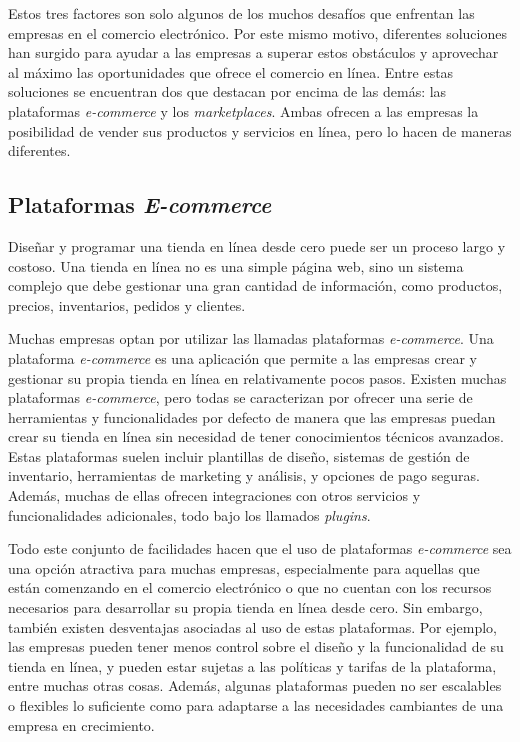 Estos tres factores son solo algunos de los muchos desafíos que enfrentan las empresas en el comercio electrónico. Por este mismo motivo, diferentes soluciones han surgido para ayudar a las empresas a superar estos obstáculos y aprovechar al máximo las oportunidades que ofrece el comercio en línea. Entre estas soluciones se encuentran dos que destacan por encima de las demás: las plataformas \textit{e-commerce} y los \textit{marketplaces}. Ambas ofrecen a las empresas la posibilidad de vender sus productos y servicios en línea, pero lo hacen de maneras diferentes.

\subsection{Plataformas \textit{E-commerce}}

Diseñar y programar una tienda en línea desde cero puede ser un proceso largo y costoso. Una tienda en línea no es una simple página web, sino un sistema complejo que debe gestionar una gran cantidad de información, como productos, precios, inventarios, pedidos y clientes.

Muchas empresas optan por utilizar las llamadas plataformas \textit{e-commerce}. Una plataforma \textit{e-commerce} es una aplicación que permite a las empresas crear y gestionar su propia tienda en línea en relativamente pocos pasos. Existen muchas plataformas \textit{e-commerce}, pero todas se caracterizan por ofrecer una serie de herramientas y funcionalidades por defecto de manera que las empresas puedan crear su tienda en línea sin necesidad de tener conocimientos técnicos avanzados. Estas plataformas suelen incluir plantillas de diseño, sistemas de gestión de inventario, herramientas de marketing y análisis, y opciones de pago seguras. Además, muchas de ellas ofrecen integraciones con otros servicios y funcionalidades adicionales, todo bajo los llamados \textit{plugins}. \cite{adobe_ecommerce_platforms}

Todo este conjunto de facilidades hacen que el uso de plataformas \textit{e-commerce} sea una opción atractiva para muchas empresas, especialmente para aquellas que están comenzando en el comercio electrónico o que no cuentan con los recursos necesarios para desarrollar su propia tienda en línea desde cero. Sin embargo, también existen desventajas asociadas al uso de estas plataformas. Por ejemplo, las empresas pueden tener menos control sobre el diseño y la funcionalidad de su tienda en línea, y pueden estar sujetas a las políticas y tarifas de la plataforma, entre muchas otras cosas. Además, algunas plataformas pueden no ser escalables o flexibles lo suficiente como para adaptarse a las necesidades cambiantes de una empresa en crecimiento.

